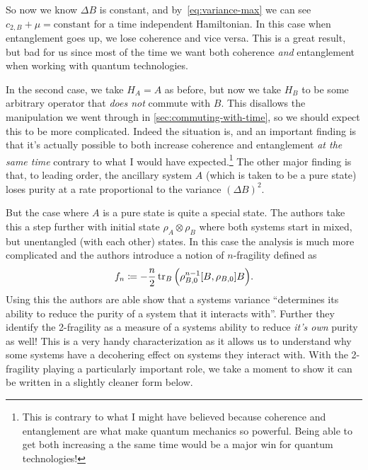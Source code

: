 \documentclass[11pt,english]{article}
\theoremstyle{definition}
\newcommand{\twonormE}[1][\rho]{c_{2,B}}
\begin{document}
So now we know $\Delta B$ is constant, and by~\cref{eq:variance-max} we can see $\twonormE + \mu = \text{constant}$ for a time independent Hamiltonian. In this case when entanglement goes up, we lose coherence and vice versa. This is a great result, but bad for us since most of the time we want both coherence \emph{and} entanglement when working with quantum technologies.

In the second case, we take $H_A = A$ as before, but now we take $H_B$ to be some arbitrary operator that \emph{does not} commute with $B$. This disallows the manipulation we went through in \cref{sec:commuting-with-time}, so we should expect this to be more complicated. Indeed the situation is, and an important finding is that it's actually possible to both increase coherence and entanglement \emph{at the same time} contrary to what I would have expected.\footnote{This is contrary to what I might have believed because coherence and entanglement are what make quantum mechanics so powerful. Being able to get both increasing a the same time would be a major win for quantum technologies!} The other major finding is that, to leading order, the ancillary system $A$ (which is taken to be a pure state) loses purity at a rate proportional to the variance $(\Delta B)^2$.

But the case where $A$ is a pure state is quite a special state. The authors take this a step further with initial state $\rho_A\otimes \rho_B$ where both systems start in mixed, but unentangled (with each other) states. In this case the analysis is much more complicated and the authors introduce a notion of $n$-fragility defined as
\begin{equation*}
	f_n\coloneqq -\frac{n}{2}\tr_B\qty(\rho_{B,0}^{n-1}\comm{B}{\rho_{B,0}}B).
\end{equation*}
Using this the authors are able show that a systems variance ``determines its ability to reduce the purity of a system that it interacts with''. Further they identify the 2-fragility as a measure of a systems ability to reduce \emph{it's own} purity as well! This is a very handy characterization as it allows us to understand why some systems have a decohering effect on systems they interact with. With the 2-fragility playing a particularly important role, we take a moment to show it can be written in a slightly cleaner form below.
\end{document}
